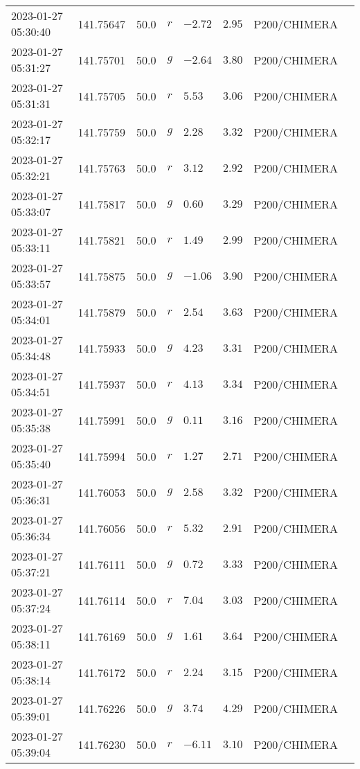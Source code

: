 \documentclass{nature_plusfigure}
\begin{document}
\begin{supplement}
\begin{center}
\begin{longtable}{llllllll}
2023-01-27 05:30:40 & 141.75647 & 50.0 & $r$ & $-2.72$ & $2.95$ & P200/CHIMERA &  \\ 
2023-01-27 05:31:27 & 141.75701 & 50.0 & $g$ & $-2.64$ & $3.80$ & P200/CHIMERA &  \\ 
2023-01-27 05:31:31 & 141.75705 & 50.0 & $r$ & $5.53$ & $3.06$ & P200/CHIMERA &  \\ 
2023-01-27 05:32:17 & 141.75759 & 50.0 & $g$ & $2.28$ & $3.32$ & P200/CHIMERA &  \\ 
2023-01-27 05:32:21 & 141.75763 & 50.0 & $r$ & $3.12$ & $2.92$ & P200/CHIMERA &  \\ 
2023-01-27 05:33:07 & 141.75817 & 50.0 & $g$ & $0.60$ & $3.29$ & P200/CHIMERA &  \\ 
2023-01-27 05:33:11 & 141.75821 & 50.0 & $r$ & $1.49$ & $2.99$ & P200/CHIMERA &  \\ 
2023-01-27 05:33:57 & 141.75875 & 50.0 & $g$ & $-1.06$ & $3.90$ & P200/CHIMERA &  \\ 
2023-01-27 05:34:01 & 141.75879 & 50.0 & $r$ & $2.54$ & $3.63$ & P200/CHIMERA &  \\ 
2023-01-27 05:34:48 & 141.75933 & 50.0 & $g$ & $4.23$ & $3.31$ & P200/CHIMERA &  \\ 
2023-01-27 05:34:51 & 141.75937 & 50.0 & $r$ & $4.13$ & $3.34$ & P200/CHIMERA &  \\ 
2023-01-27 05:35:38 & 141.75991 & 50.0 & $g$ & $0.11$ & $3.16$ & P200/CHIMERA &  \\ 
2023-01-27 05:35:40 & 141.75994 & 50.0 & $r$ & $1.27$ & $2.71$ & P200/CHIMERA &  \\ 
2023-01-27 05:36:31 & 141.76053 & 50.0 & $g$ & $2.58$ & $3.32$ & P200/CHIMERA &  \\ 
2023-01-27 05:36:34 & 141.76056 & 50.0 & $r$ & $5.32$ & $2.91$ & P200/CHIMERA &  \\ 
2023-01-27 05:37:21 & 141.76111 & 50.0 & $g$ & $0.72$ & $3.33$ & P200/CHIMERA &  \\ 
2023-01-27 05:37:24 & 141.76114 & 50.0 & $r$ & $7.04$ & $3.03$ & P200/CHIMERA &  \\ 
2023-01-27 05:38:11 & 141.76169 & 50.0 & $g$ & $1.61$ & $3.64$ & P200/CHIMERA &  \\ 
2023-01-27 05:38:14 & 141.76172 & 50.0 & $r$ & $2.24$ & $3.15$ & P200/CHIMERA &  \\ 
2023-01-27 05:39:01 & 141.76226 & 50.0 & $g$ & $3.74$ & $4.29$ & P200/CHIMERA &  \\ 
2023-01-27 05:39:04 & 141.76230 & 50.0 & $r$ & $-6.11$ & $3.10$ & P200/CHIMERA &  \\ 

\end{longtable}
\end{center}
\end{supplement}
\end{document}

